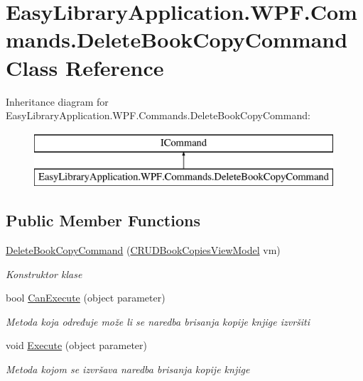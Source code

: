 \hypertarget{class_easy_library_application_1_1_w_p_f_1_1_commands_1_1_delete_book_copy_command}{}\section{Easy\+Library\+Application.\+W\+P\+F.\+Commands.\+Delete\+Book\+Copy\+Command Class Reference}
\label{class_easy_library_application_1_1_w_p_f_1_1_commands_1_1_delete_book_copy_command}
Inheritance diagram for Easy\+Library\+Application.\+W\+P\+F.\+Commands.\+Delete\+Book\+Copy\+Command\+:\begin{figure}[H]
\begin{center}
\leavevmode
\includegraphics[height=2.000000cm]{class_easy_library_application_1_1_w_p_f_1_1_commands_1_1_delete_book_copy_command}
\end{center}
\end{figure}
\subsection*{Public Member Functions}
\begin{DoxyCompactItemize}
\item 
\mbox{\hyperlink{class_easy_library_application_1_1_w_p_f_1_1_commands_1_1_delete_book_copy_command_a4b5a4ea4ecafeb1c105894bf1b4b078a}{Delete\+Book\+Copy\+Command}} (\mbox{\hyperlink{class_easy_library_application_1_1_w_p_f_1_1_view_model_1_1_c_r_u_d_book_copies_view_model}{C\+R\+U\+D\+Book\+Copies\+View\+Model}} vm)
\begin{DoxyCompactList}\small\item\em Konstruktor klase \end{DoxyCompactList}\item 
bool \mbox{\hyperlink{class_easy_library_application_1_1_w_p_f_1_1_commands_1_1_delete_book_copy_command_a9864902bca3abaea9faae58b4d1b6878}{Can\+Execute}} (object parameter)
\begin{DoxyCompactList}\small\item\em Metoda koja određuje može li se naredba brisanja kopije knjige izvršiti \end{DoxyCompactList}\item 
void \mbox{\hyperlink{class_easy_library_application_1_1_w_p_f_1_1_commands_1_1_delete_book_copy_command_a3dd5ba8ea135d857628b41146189c92f}{Execute}} (object parameter)
\begin{DoxyCompactList}\small\item\em Metoda kojom se izvršava naredba brisanja kopije knjige \end{DoxyCompactList}\end{DoxyCompactItemize}
